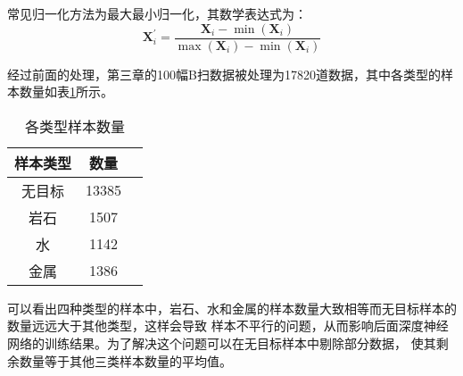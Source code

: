 常见归一化方法为最大最小归一化，其数学表达式为：
\begin{equation}
	\mathbf{X}_i^{\prime}=\frac{\mathbf{X}_i-\min (\mathbf{X}_i)}
	{\max (\mathbf{X}_i)-\min (\mathbf{X}_i)}
\end{equation}

经过前面的处理，第三章的100幅B扫数据被处理为17820道数据，其中各类型的样本数量如表\ref{table_sample_kind_unbalanced}所示。
\begin{table}[h]
	\caption{各类型样本数量} 
	\begin{tabular}{|c|c|c|} 
		\hline  
		样本类型 &  数量\\
		\hline 
		无目标 & 13385 \\  
		\hline  
		岩石 & 1507 \\  
		\hline  
		水 & 1142\\
		\hline
		金属 & 1386 \\
		\hline  
	\end{tabular}
	\label{table_sample_kind_unbalanced}
\end{table}

可以看出四种类型的样本中，岩石、水和金属的样本数量大致相等而无目标样本的数量远远大于其他类型，这样会导致
样本不平行的问题，从而影响后面深度神经网络的训练结果。为了解决这个问题可以在无目标样本中剔除部分数据，
使其剩余数量等于其他三类样本数量的平均值。

